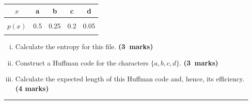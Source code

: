\documentclass[12pt]{article}
\begin{document}
\begin{enumerate}[a)]
\begin{center}
\begin{tabular}{|c|cccc|}
$x$        & a & b & c & d \\
\hline
&&&&\\[-0.4cm]
$p(x)$ & 0.5 & 0.25 & 0.2 & 0.05 \\
\hline
\multicolumn{5}{c}{}
\end{tabular}
\end{center}
    \begin{enumerate}[i)]\itemsep0.3cm
    \item Calculate the entropy for this file. \hfill{\mbox{\scriptsize \bf (3 marks)}}
    \item Construct a Huffman code for the characters $\{a,b,c,d\}$. \hfill{\mbox{\scriptsize \bf (3 marks)}}
    \item Calculate the expected length of this Huffman code and, hence, its efficiency. \hfill{\scriptsize \bf (4 marks)}
    \end{enumerate}
    \begin{center}\noindent\rule{0.4\linewidth}{0.5pt}\end{center}
\end{enumerate}

\newpage
\end{document}
